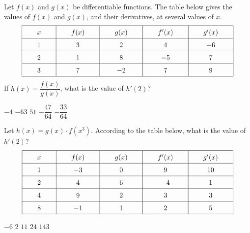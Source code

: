 \begin{questions}
    \question Let $f(x)$ and $g(x)$ be differentiable functions. The table below gives the values of $f(x)$ and $g(x)$, and their derivatives, at several values of $x$. \begin{align*}
        \arraycolsep=22pt\def\arraystretch{1.5} 
        \begin{array}{|c|c|c|c|c|}
            \hline
            x & f(x) & g(x) & f'(x) & g'(x) \\ \hline
            1 & 3 & 2 & 4 & -6 \\ \hline
            2 & 1 & 8 & -5 & 7 \\ \hline
            3 & 7 & -2 & 7 & 9 \\
            \hline
        \end{array}
    \end{align*}
    If $h(x) = \dfrac{f(x)}{g(x)}$, what is the value of $h'(2)$?

    \begin{oneparchoices}
        \choice $-4$
        \choice $-63$
        \choice $51$
        \choice $-\dfrac{47}{64}$
        \choice $-\dfrac{33}{64}$
    \end{oneparchoices} \par \horizontalline

    \question Let $h(x) = g(x) \cdot f\left(x^3\right)$. According to the table below, what is the value of $h'(2)$? \begin{align*}
        \arraycolsep=22pt\def\arraystretch{1.5} 
        \begin{array}{|c|c|c|c|c|}
            \hline
            x & f(x) & g(x) & f'(x) & g'(x) \\ \hline
            1 & -3 & 0 & 9 & 10 \\ \hline
            2 & 4 & 6 & -4 & 1 \\ \hline
            4 & 9 & 2 & 3 & 3 \\ \hline
            8 & -1 & 1 & 2 & 5 \\
            \hline
        \end{array}
    \end{align*}

    \begin{oneparchoices}
        \choice $-6$
        \choice $2$
        \choice $11$
        \choice $24$
        \choice $143$
    \end{oneparchoices} \par \horizontalline


\end{questions}

